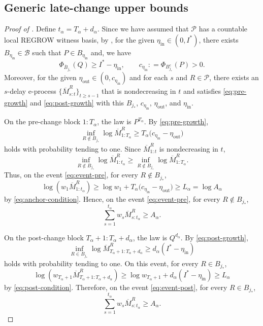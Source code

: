 \documentclass[12pt]{article}
\theoremstyle{spaced}
\theoremstyle{remark}
\newcommand{\calP}{\mathcal P}
\newcommand{\defeq}{\mathrel{\mathop:}=}
\begin{document}
\subsection{Generic late-change upper bounds}\label{app:proof-generic-upper}

\begin{proof}[Proof of ]
Define $t_\alpha=T_\alpha+d_\alpha$. Since we have assumed that
$\calP$ has a countable local REGROW witness basis, by
, for the given
$\eta_{\mathrm{in}}\in(0,I^*)$, there exists
$B_{\eta_{\mathrm{in}}}\in\mathscr B$ such that
$P\in B_{\eta_{\mathrm{in}}}$ and,
we have
\[
  \Phi_{\overline B_{j_*}}(Q)
  \ge I^*-\eta_{\mathrm{in}},
  \qquad
  c_{\eta_{\mathrm{in}}}
  \defeq
  \Phi_{B_{j_*}^c}(P)>0.
\]
Moreover, for the given
$\eta_{\mathrm{out}}\in(0,c_{\eta_{\mathrm{in}}})$ and for each
$s$ and $R\in\calP$, there exists an $s$-delay e-process
$\{\overline M_{s:t}^R\}_{t\geq s-1}$ that is nondecreasing in $t$
and satisfies \eqref{eq:pre-growth} and \eqref{eq:post-growth} with
this $B_{j_*}$, $c_{\eta_{\mathrm{in}}}$,
$\eta_{\mathrm{out}}$, and $\eta_{\mathrm{in}}$.

On the pre-change block $1:T_\alpha$, the law is $P^{T_\alpha}$.
By \eqref{eq:pre-growth},
\begin{equation}
\label{eq:event-pre}
  \inf_{R\notin B_{j_*}}
  \log \overline M_{1:T_\alpha}^R
  \ge
  T_\alpha
  \bigl(c_{\eta_{\mathrm{in}}}-\eta_{\mathrm{out}}\bigr)
\end{equation}
holds with probability tending to one.  Since
$\overline M_{1:t}^R$ is nondecreasing in $t$,
\[
  \inf_{R\notin B_{j_*}}
  \log \overline M_{1:t_\alpha}^R
  \ge
  \inf_{R\notin B_{j_*}}
  \log \overline M_{1:T_\alpha}^R.
\]
Thus, on the event \eqref{eq:event-pre}, for every
$R\notin B_{j_*}$,
\[
  \log\left(w_1\overline M_{1:t_\alpha}^R\right)
  \ge
  \log w_1+
  T_\alpha
  \bigl(c_{\eta_{\mathrm{in}}}-\eta_{\mathrm{out}}\bigr)
  \ge L_\alpha
  =\log A_\alpha
\]
by \eqref{eq:anchor-condition}.  Hence, on the event
\eqref{eq:event-pre}, for every
$R\notin B_{j_*}$,
\begin{equation}
\label{eq:outside-large}
  \sum_{s=1}^{t_\alpha}
  w_s\overline M_{s:t_\alpha}^R
  \ge A_\alpha.
\end{equation}

On the post-change block
$T_\alpha+1:T_\alpha+d_\alpha$, the law is $Q^{d_\alpha}$.
By \eqref{eq:post-growth},
\begin{equation}
\label{eq:event-post}
  \inf_{R\in B_{j_*}}
  \log
  \overline M_{T_\alpha+1:T_\alpha+d_\alpha}^R
  \ge
  d_\alpha(I^*-\eta_{\mathrm{in}})
\end{equation}
holds with probability tending to one.  On this event, for every
$R\in B_{j_*}$,
\[
  \log\left(
    w_{T_\alpha+1}
    \overline M_{T_\alpha+1:T_\alpha+d_\alpha}^R
  \right)
  \ge
  \log w_{T_\alpha+1}
  +d_\alpha(I^*-\eta_{\mathrm{in}})
  \ge L_\alpha
\]
by \eqref{eq:post-condition}.  Therefore, on the event
\eqref{eq:event-post}, for every
$R\in B_{j_*}$,
\begin{equation}
\label{eq:inside-large}
  \sum_{s=1}^{t_\alpha}
  w_s\overline M_{s:t_\alpha}^R
  \ge A_\alpha.
\end{equation}


\end{proof}
\end{document}
